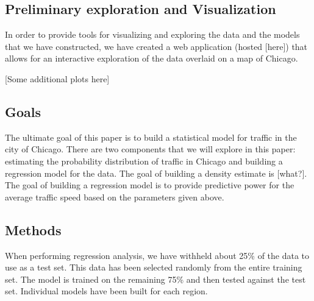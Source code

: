 \documentclass[12pt]{article}
\begin{document}
\subsection{Preliminary exploration and Visualization}
In order to provide tools for visualizing and exploring the data and the models that we have constructed, we have created a web application (hosted [here]) that allows for an interactive exploration of the data overlaid on a map of Chicago.

[Some additional plots here]
\subsection{Goals}
The ultimate goal of this paper is to build a statistical model for traffic in the city of Chicago. There are two components that we will explore in this paper: estimating the probability distribution of traffic in Chicago and building a regression model for the data. The goal of building a density estimate is [what?]. The goal of building a regression model is to provide predictive power for the average traffic speed based on the parameters given above.
\subsection{Methods}
When performing regression analysis, we have withheld about 25\% of the data to use as a test set. This data has been selected randomly from the entire training set. The model is trained on the remaining 75\% and then tested against the test set. Individual models have been built for each region.
\end{document}
